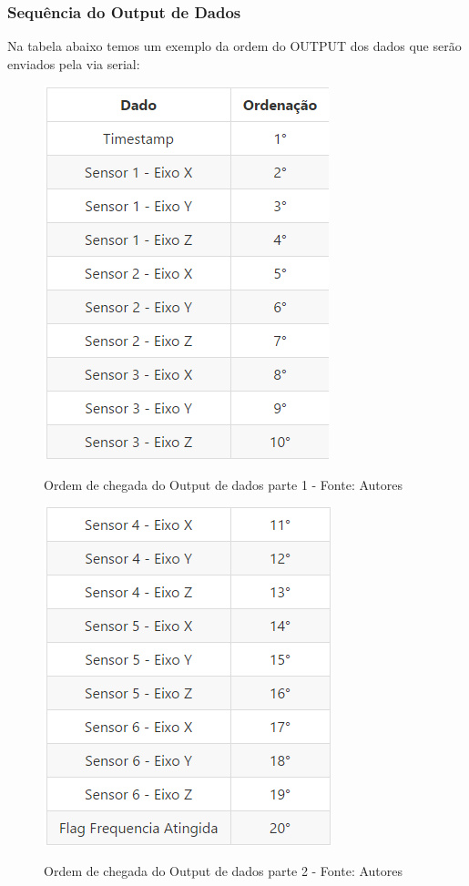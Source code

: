 \subsubsection*{Sequência do Output de Dados}

Na tabela abaixo temos um exemplo da ordem do OUTPUT dos dados que serão enviados pela via serial:

\begin{figure}[H]
\centering
\includegraphics[keepaspectratio=true,scale=0.8]{figuras/ordem_envio_1.png}
\label{fig:envio_1}
\caption{Ordem de chegada do Output de dados parte 1 - Fonte: Autores}
\end{figure}

\begin{figure}[H]
\centering
\includegraphics[keepaspectratio=true,scale=0.8]{figuras/ordem_envio_2.png}
\label{fig:envio_2}
\caption{Ordem de chegada do Output de dados parte 2 - Fonte: Autores}
\end{figure}






